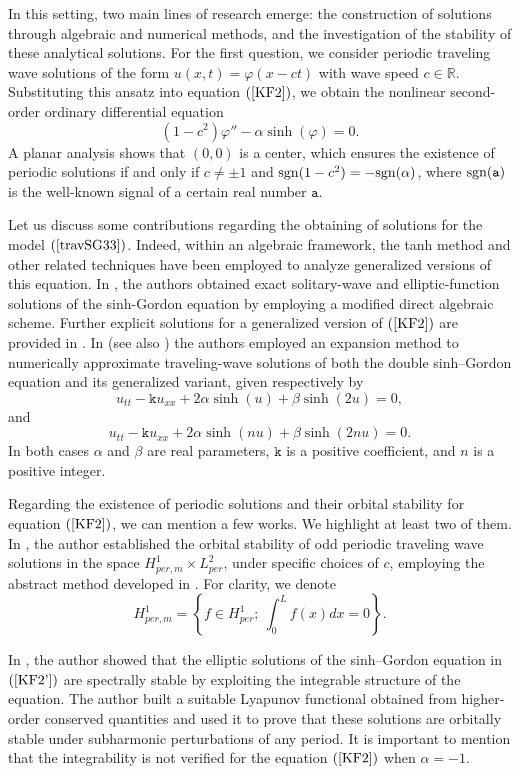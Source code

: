 \documentclass[12pt,reqno,a4paper]{amsart} %
\numberwithin{equation}{section}
\numberwithin{figure}{section}
\begin{document}
In this setting, two main lines of research emerge: the construction of solutions through algebraic and numerical methods, and the investigation of the stability of these analytical solutions. For the first question, we consider periodic traveling wave solutions of the form $u(x,t)=\varphi(x-ct)$ with wave speed $c\in \mathbb{R}$. Substituting this ansatz into equation $(\ref{KF2})$, we obtain the nonlinear second-order ordinary differential equation
\begin{equation}\label{travSG33}
(1-c^2)\varphi'' - \alpha\sinh(\varphi) = 0.
\end{equation}
A planar analysis shows that $(0,0)$ is a center, which ensures the existence of periodic solutions if and only if $c \neq \pm 1$ and ${\rm sgn}(1-c^2) = -{\rm sgn}(\alpha)$, where ${\rm sgn}(\mathtt{a})$ is the well-known signal of a certain real number $\mathtt{a}$.

 Let us discuss some contributions regarding the obtaining of solutions for the model $(\ref{travSG33})$. Indeed, within an algebraic framework, the tanh method and other related techniques have been employed to analyze generalized versions of this equation. In \cite{Lu2019}, the authors obtained exact solitary-wave and elliptic-function solutions of the sinh-Gordon equation
 by employing a modified direct algebraic scheme. Further explicit solutions for a generalized version of $(\ref{KF2})$ are provided in \cite{wazwaz2006}. In \cite{article1512} (see also \cite{ali2024}) the authors employed an expansion method to numerically approximate traveling-wave solutions of both the double sinh--Gordon equation and its generalized variant, given respectively by
$$
u_{tt} -\mathtt{k}u_{xx} + 2\alpha \sinh(u) + \beta \sinh(2u) = 0,$$
and
$$
u_{tt} - \mathtt{k}u_{xx} + 2\alpha \sinh(nu) + \beta \sinh(2nu) = 0.
$$
In both cases $\alpha$ and $\beta$ are real parameters, $\mathtt{k}$ is a positive coefficient, and $n$ is a positive integer.  
   
Regarding the existence of periodic solutions and their orbital stability for equation $(\ref{KF2})$, we can mention a few works. We highlight at least two of them. In \cite{Natali2011}, the author established the orbital stability of odd periodic traveling wave solutions in the space $H^1_{per,m}\times L^2_{per}$, under specific choices of $c$, employing the abstract method developed in \cite{grillakis1}. For clarity, we denote
$$H^1_{per,m}= \left\{ f\in H^1_{per}; \ \displaystyle \int_{0}^{L} f(x)dx=0\right\}.$$ 
   
 In \cite{Deconinck}, the author  showed that the elliptic solutions of the sinh–Gordon equation in $(\ref{KF2'})$ are spectrally stable by exploiting the integrable structure of the equation. The author built a suitable Lyapunov functional obtained from higher-order conserved quantities and used it to prove that these solutions are orbitally stable under subharmonic perturbations of any period. It is important to mention that the integrability is not verified for the equation $(\ref{KF2})$ when $\alpha=-1$. 
 
\end{document}
